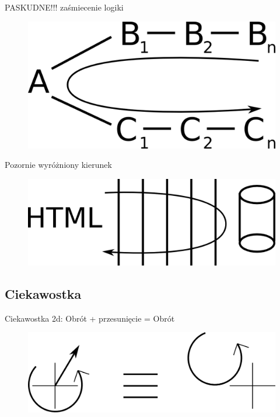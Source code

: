 \documentclass[smaller]{beamer}
\begin{document}
\begin{frame}{PASKUDNE!!! zaśmiecenie logiki}
\begin{figure}
 \centering
 \includegraphics[width=1\textwidth]{logicGarbageComplexFig}
\end{figure}

\end{frame}

\begin{frame}{Pozornie wyróżniony kierunek}
\begin{figure}
 \centering
 \includegraphics[width=1\textwidth]{pozornyKierunekFig}
\end{figure} 
\end{frame}

\subsection{Ciekawostka}
\begin{frame}{Ciekawostka}
 2d: Obrót + przesunięcie = Obrót
\begin{figure}
 \centering
 \includegraphics[width=1\textwidth]{rotation2dFig}
\end{figure}
\end{frame}
\end{document}
